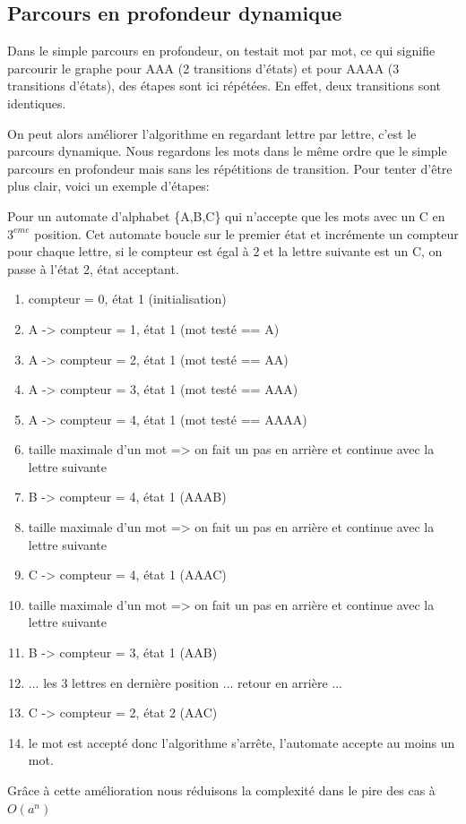 \subsection{Parcours en profondeur dynamique}
Dans le simple parcours en profondeur, on testait mot par mot, ce qui signifie parcourir le graphe pour AAA (2 transitions d'états) et pour AAAA (3 transitions d'états), des étapes sont ici répétées. En effet, deux transitions sont identiques.\par
On peut alors améliorer l'algorithme en regardant lettre par lettre, c'est le parcours dynamique. Nous regardons les mots dans le même ordre que le simple parcours en profondeur mais sans les répétitions de transition. Pour tenter d'être plus clair, voici un exemple d'étapes:\par
Pour un automate d'alphabet \{A,B,C\} qui n'accepte que les mots avec un C en $3^{eme}$ position. Cet automate boucle sur le premier état et incrémente un compteur pour chaque lettre, si le compteur est égal à 2 et la lettre suivante est un C, on passe à l'état 2, état acceptant.
\begin{enumerate}
    \item compteur = 0, état 1  (initialisation)
    \item A -> compteur = 1, état 1 (mot testé == A)
    \item A -> compteur = 2, état 1 (mot testé == AA)
    \item A -> compteur = 3, état 1 (mot testé == AAA)
    \item A -> compteur = 4, état 1 (mot testé == AAAA)
    \item taille maximale d'un mot => on fait un pas en arrière et continue avec la lettre suivante
    \item B -> compteur = 4, état 1 (AAAB)
    \item taille maximale d'un mot => on fait un pas en arrière et continue avec la lettre suivante
    \item C -> compteur = 4, état 1 (AAAC)
    \item taille maximale d'un mot => on fait un pas en arrière et continue avec la lettre suivante
    \item B -> compteur = 3, état 1 (AAB)
    \item ... les 3 lettres en dernière position ... retour en arrière ...
    \item C -> compteur = 2, état 2 (AAC)
    \item le mot est accepté donc l'algorithme s'arrête, l'automate accepte au moins un mot.
\end{enumerate}\par
Grâce à cette amélioration nous réduisons la complexité dans le pire des cas à  $O(a^{n})$ \par

